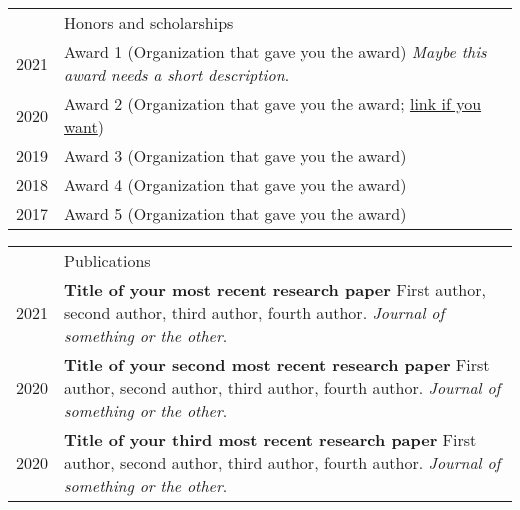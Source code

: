 \documentclass[letterpaper, 11pt]{article}
\newcommand{\headingfont}{\Large\color{OliveGreen}}
\newenvironment{SectionTable}[1]{
	\renewcommand*{\arraystretch}{1.6}
	\setlength{\tabcolsep}{10pt}
	\begin{longtable}[r]{R{1in} L{5.4in}} & #1 \\}
{\end{longtable}\vspace{-.3cm}}
\newenvironment{SectionTableSingleSpace}[1]{
	\renewcommand*{\arraystretch}{1.3}
	\setlength{\tabcolsep}{10pt}
	\begin{longtable}[r]{R{1in} L{5.4in}} & #1 \\[.5em]}
{\end{longtable}\vspace{-.3cm}}
\begin{document}

\begin{SectionTableSingleSpace}{\headingfont Honors and scholarships}
2021 & 
Award 1 (Organization that gave you the award)\newline
\textit{Maybe this award needs a short description}. \\

2020 &
Award 2 (Organization that gave you the award; \href{https://en.wikibooks.org/wiki/LaTeX/Hyperlinks}{link if you want}) \\

2019 &
Award 3 (Organization that gave you the award) \\

2018 &
Award 4 (Organization that gave you the award) \\

2017 &
Award 5 (Organization that gave you the award)
\end{SectionTableSingleSpace}


\begin{SectionTable}{\headingfont Publications} 
2021 & 
\textbf{Title of your most recent research paper} \newline
First author, second author, third author, fourth author. \newline
\textit{Journal of something or the other}. \\

2020 & 
\textbf{Title of your second most recent research paper} \newline
First author, second author, third author, fourth author. \newline
\textit{Journal of something or the other}. \\

2020 & 
\textbf{Title of your third most recent research paper} \newline
First author, second author, third author, fourth author. \newline
\textit{Journal of something or the other}.
\end{SectionTable}

\end{document}

